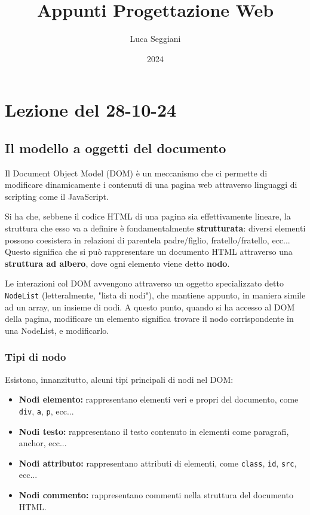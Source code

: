 \documentclass[a4paper,11pt]{article}
\title{Appunti Progettazione Web}
\author{Luca Seggiani}
\date{2024}
\begin{document}
\section{Lezione del 28-10-24}

\thispagestyle{empty}
\pagestyle{fancy}

\lstset{language=javascript, style=codestyle}

\subsection{Il modello a oggetti del documento}
Il Document Object Model (DOM) è un meccanismo che ci permette di modificare dinamicamente i contenuti di una pagina web attraverso linguaggi di scripting come il JavaScript.

Si ha che, sebbene il codice HTML di una pagina sia effettivamente lineare, la struttura che esso va a definire è fondamentalmente \textbf{strutturata}: diversi elementi possono coesistera in relazioni di parentela padre/figlio, fratello/fratello, ecc...
Questo significa che si può rappresentare un documento HTML attraverso una \textbf{struttura ad albero}, dove ogni elemento viene detto \textbf{nodo}.

Le interazioni col DOM avvengono attraverso un oggetto specializzato detto \lstinline|NodeList| (letteralmente, "lista di nodi"), che mantiene appunto, in maniera simile ad un array, un insieme di nodi.
A questo punto, quando si ha accesso al DOM della pagina, modificare un elemento significa trovare il nodo corrispondente in una NodeList, e modificarlo.

\subsubsection{Tipi di nodo}
Esistono, innanzitutto, alcuni tipi principali di nodi nel DOM:
\begin{itemize}
	\item \textbf{Nodi elemento:} rappresentano elementi veri e propri del documento, come \lstinline|div|, \lstinline|a|, \lstinline|p|, ecc...
	\item \textbf{Nodi testo:} rappresentano il testo contenuto in elementi come paragrafi, anchor, ecc...
	\item \textbf{Nodi attributo:} rappresentano attributi di elementi, come \lstinline|class|, \lstinline|id|, \lstinline|src|, ecc...
	\item \textbf{Nodi commento:} rappresentano commenti nella struttura del documento HTML. 
\end{itemize}
\end{document}
